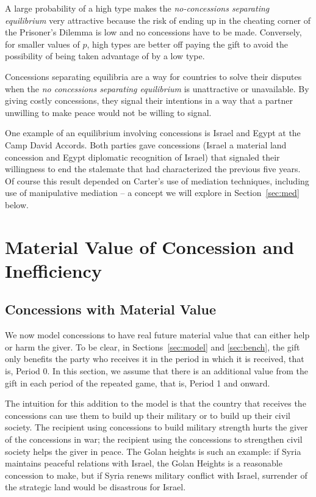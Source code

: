 \documentclass[12pt, letterpaper]{article}
\begin{document}
A large probability of a high type makes the \emph{no-concessions separating equilibrium} very attractive because the risk of ending up in the cheating corner of the Prisoner's Dilemma is low and no concessions have to be made. Conversely, for smaller values of $p$, high types are better off paying the gift to avoid the possibility of being taken advantage of by a low type.

Concessions separating equilibria are a way for countries to solve their disputes when the \emph{no concessions separating equilibrium} is unattractive or unavailable. By giving costly concessions, they signal their intentions in a way that a partner unwilling to make peace would not be willing to signal. 

One example of an equilibrium involving concessions is Israel and Egypt at the Camp David Accords. Both parties gave concessions (Israel a material land concession and Egypt diplomatic recognition of Israel) that signaled their willingness to end the stalemate that had characterized the previous five years. Of course this result depended on Carter's use of mediation techniques, including use of manipulative mediation -- a concept we will explore in Section~\ref{sec:med} below. 

\section{Material Value of Concession and Inefficiency} 
\label{sec:IC}

\subsection{Concessions with Material Value}
We now model concessions to have real future material value that can either help or harm the giver. To be clear, in Sections~\ref{sec:model} and \ref{sec:bench}, the gift only benefits the party who receives it in the period in which it is received, that is, Period 0. In this section, we assume that there is an additional value from the gift in each period of the repeated game, that is, Period 1 and onward.

The intuition for this addition to the model is that the country that receives the concessions can use them to build up their military or to build up their civil society. The recipient using concessions to build military strength hurts the giver of the concessions in war; the recipient using the concessions to strengthen civil society helps the giver in peace. The Golan heights is such an example: if Syria maintains peaceful relations with Israel, the Golan Heights is a reasonable concession to make, but if Syria renews military conflict with Israel, surrender of the strategic land would be disastrous for Israel. 
\end{document}

